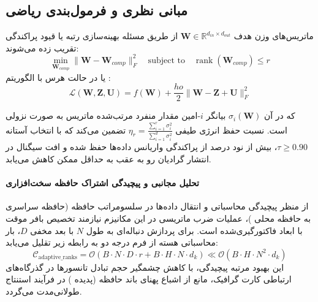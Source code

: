 \subsection{مبانی نظری و فرمول‌بندی ریاضی}
ماتریس‌های وزن هدف $\mathbf{W} \in \mathbb{R}^{d_{in} \times d_{out}}$ از طریق مسئله بهینه‌سازی رتبه یا قیود پراکندگی تقریب زده می‌شوند:
 \begin{equation}
\min_{\mathbf{W}_{comp}} \|\mathbf{W} - \mathbf{W}_{comp}\|_F^2 \quad \text{subject to} \quad \operatorname{rank}(\mathbf{W}_{comp}) \le r
\end{equation}
یا در حالت هرس با الگوریتم :
 \begin{equation}
\mathcal{L}(\mathbf{W}, \mathbf{Z}, \mathbf{U}) = f(\mathbf{W}) +\frac{
ho}{2} \|\mathbf{W} - \mathbf{Z} + \mathbf{U}\|_F^2
\end{equation}

که در آن $\sigma_i(\mathbf{W})$ بیانگر $i$-امین مقدار منفرد مرتب‌شده ماتریس به صورت نزولی است. نسبت حفظ انرژی طیفی $\eta_r = \frac{\sum_{i=1}^r \sigma_i^2}{\sum_{i=1}^{d} \sigma_i^2}$ تضمین می‌کند که با انتخاب آستانه $\tau \ge 0.90$، بیش از نود درصد از پراکندگی واریانس داده‌ها حفظ شده و افت سیگنال در انتشار گرادیان رو به عقب به حداقل ممکن کاهش می‌یابد.

\paragraph{تحلیل مجانبی و پیچیدگی اشتراک حافظه سخت‌افزاری}
از منظر پیچیدگی محاسباتی و انتقال داده‌ها در سلسومراتب حافظه (حافظه سراسری  به حافظه محلی )، عملیات ضرب ماتریسی در این مکانیزم نیازمند تخصیص بافر موقت با ابعاد فاکتورگیری‌شده است. برای پردازش دنباله‌ای به طول $N$ با بعد مخفی $D$، بار محاسباتی هسته از فرم درجه دو به رابطه زیر تقلیل می‌یابد:
\begin{equation}
\label{eq:complexity_adaptive_ranks}
\mathcal{C}_{\text{adaptive\_ranks}} = \mathcal{O}\left( B \cdot N \cdot D \cdot r + B \cdot H \cdot N \cdot d_k \right) \ll \mathcal{O}\left( B \cdot H \cdot N^2 \cdot d_k \right)
\end{equation}
این بهبود مرتبه پیچیدگی، با کاهش چشمگیر حجم تبادل تانسورها در گذرگاه‌های ارتباطی کارت گرافیک، مانع از اشباع پهنای باند حافظه (پدیده ) در فرآیند استنتاج طولانی‌مدت می‌گردد.
